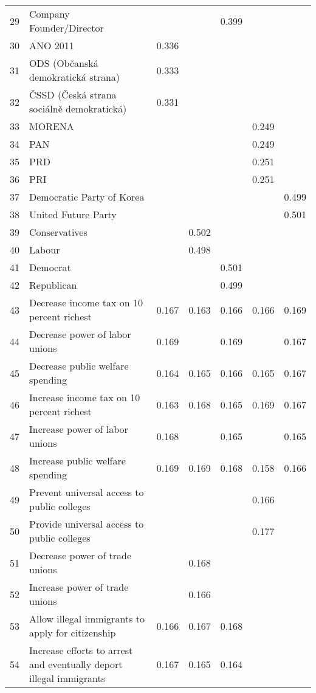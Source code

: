 \begin{longtable}{lp{7cm}ccccc}
  29 & Company Founder/Director &  &  & 0.399 &  &  \\ 
  30 & ANO 2011 & 0.336 &  &  &  &  \\ 
  31 & ODS (Občanská demokratická strana) & 0.333 &  &  &  &  \\ 
  32 & ČSSD (Česká strana sociálně demokratická) & 0.331 &  &  &  &  \\ 
  33 & MORENA &  &  &  & 0.249 &  \\ 
  34 & PAN &  &  &  & 0.249 &  \\ 
  35 & PRD &  &  &  & 0.251 &  \\ 
  36 & PRI &  &  &  & 0.251 &  \\ 
  37 & Democratic Party of Korea &  &  &  &  & 0.499 \\ 
  38 & United Future Party &  &  &  &  & 0.501 \\ 
  39 & Conservatives &  & 0.502 &  &  &  \\ 
  40 & Labour &  & 0.498 &  &  &  \\ 
  41 & Democrat &  &  & 0.501 &  &  \\ 
  42 & Republican &  &  & 0.499 &  &  \\ 
  43 & Decrease income tax on 10 percent richest & 0.167 & 0.163 & 0.166 & 0.166 & 0.169 \\ 
  44 & Decrease power of labor unions & 0.169 &  & 0.169 &  & 0.167 \\ 
  45 & Decrease public welfare spending & 0.164 & 0.165 & 0.166 & 0.165 & 0.167 \\ 
  46 & Increase income tax on 10 percent richest & 0.163 & 0.168 & 0.165 & 0.169 & 0.167 \\ 
  47 & Increase power of labor unions & 0.168 &  & 0.165 &  & 0.165 \\ 
  48 & Increase public welfare spending & 0.169 & 0.169 & 0.168 & 0.158 & 0.166 \\ 
  49 & Prevent universal access to public colleges &  &  &  & 0.166 &  \\ 
  50 & Provide universal access to public colleges &  &  &  & 0.177 &  \\ 
  51 & Decrease power of trade unions &  & 0.168 &  &  &  \\ 
  52 & Increase power of trade unions &  & 0.166 &  &  &  \\ 
  53 & Allow illegal immigrants to apply for citizenship & 0.166 & 0.167 & 0.168 &  &  \\ 
  54 & Increase efforts to arrest and eventually deport illegal immigrants & 0.167 & 0.165 & 0.164 &  &  \\ 

\end{longtable}
